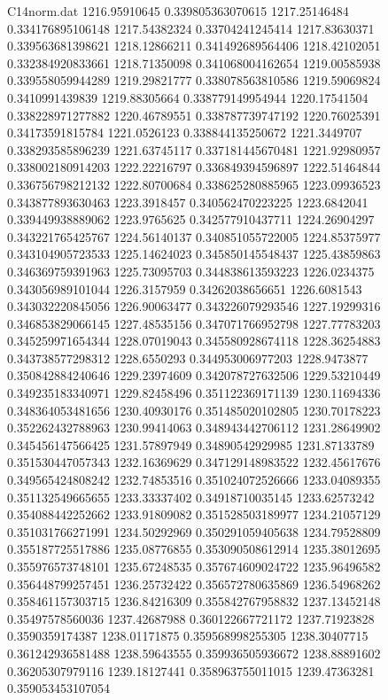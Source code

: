 \begin{filecontents}{C14norm.dat}
1216.95910645			0.339805363070615
1217.25146484			0.334176895106148
1217.54382324			0.33704241245414
1217.83630371			0.339563681398621
1218.12866211			0.341492689564406
1218.42102051			0.332384920833661
1218.71350098			0.341068004162654
1219.00585938			0.339558059944289
1219.29821777			0.338078563810586
1219.59069824			0.3410991439839
1219.88305664			0.338779149954944
1220.17541504			0.338228971277882
1220.46789551			0.338787739747192
1220.76025391			0.34173591815784
1221.0526123			0.338844135250672
1221.3449707			0.338293585896239
1221.63745117			0.337181445670481
1221.92980957			0.338002180914203
1222.22216797			0.336849394596897
1222.51464844			0.336756798212132
1222.80700684			0.338625280885965
1223.09936523			0.343877893630463
1223.3918457			0.340562470223225
1223.6842041			0.339449938889062
1223.9765625			0.342577910437711
1224.26904297			0.343221765425767
1224.56140137			0.340851055722005
1224.85375977			0.343104905723533
1225.14624023			0.345850145548437
1225.43859863			0.346369759391963
1225.73095703			0.344838613593223
1226.0234375			0.343056989101044
1226.3157959			0.34262038656651
1226.6081543			0.343032220845056
1226.90063477			0.343226079293546
1227.19299316			0.346853829066145
1227.48535156			0.347071766952798
1227.77783203			0.345259971654344
1228.07019043			0.345580928674118
1228.36254883			0.343738577298312
1228.6550293			0.344953006977203
1228.9473877			0.350842884240646
1229.23974609			0.342078727632506
1229.53210449			0.349235183340971
1229.82458496			0.351122369171139
1230.11694336			0.348364053481656
1230.40930176			0.351485020102805
1230.70178223			0.352262432788963
1230.99414063			0.348943442706112
1231.28649902			0.345456147566425
1231.57897949			0.34890542929985
1231.87133789			0.351530447057343
1232.16369629			0.347129148983522
1232.45617676			0.349565424808242
1232.74853516			0.351024072526666
1233.04089355			0.351132549665655
1233.33337402			0.34918710035145
1233.62573242			0.354088442252662
1233.91809082			0.351528503189977
1234.21057129			0.351031766271991
1234.50292969			0.350291059405638
1234.79528809			0.355187725517886
1235.08776855			0.353090508612914
1235.38012695			0.355976573748101
1235.67248535			0.357674609024722
1235.96496582			0.356448799257451
1236.25732422			0.356572780635869
1236.54968262			0.358461157303715
1236.84216309			0.355842767958832
1237.13452148			0.35497578560036
1237.42687988			0.360122667721172
1237.71923828			0.3590359174387
1238.01171875			0.359568998255305
1238.30407715			0.361242936581488
1238.59643555			0.359936505936672
1238.88891602			0.36205307979116
1239.18127441			0.358963755011015
1239.47363281			0.359053453107054

\end{filecontents}
